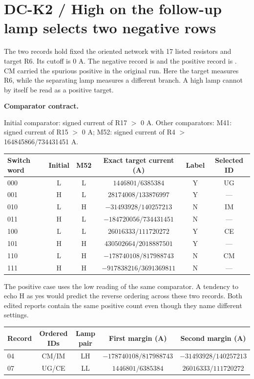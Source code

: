 \documentclass[12pt,letterpaper]{article}
\newcommand{\code}[1]{\texttt{\detokenize{#1}}}
\newcommand{\reading}[2]{\par\smallskip\textsf{\color{accent}\bfseries #1}\enspace #2\par}
\begin{document}
\clearpage\section{DC-K2 / High on the follow-up lamp selects two negative rows}

The two records hold fixed the oriented network with 17 listed resistors and target R6. Its cutoff is $0$ A. The negative record is \code{scope-04} and the positive record is \code{scope-07}. CM carried the spurious positive in the original run. Here the target measures R6, while the separating lamp measures a different branch. A high lamp cannot by itself be read as a positive target.

\reading{Comparator contract.}{} Initial comparator: signed current of R17 $>$ 0 A. Other comparators: M41: signed current of R15 $>$ 0 A; M52: signed current of R4 $>$ 164845866/734431451 A.

\begin{center}\small\begin{tabular}{@{}lccccc@{}}\toprule
Switch word & Initial & M52 & Exact target current (A) & Label & Selected ID\\\midrule
000 & L & L & $1446801/6385384$ & Y & UG\\
001 & H & L & $28174008/133876997$ & Y & ---\\
010 & L & H & $-31493928/140257213$ & N & IM\\
011 & H & L & $-184720056/734431451$ & N & ---\\
100 & L & L & $26016333/111720272$ & Y & CE\\
101 & H & H & $430502664/2018887501$ & Y & ---\\
110 & L & H & $-178740108/817988743$ & N & CM\\
111 & H & H & $-917838216/3691369811$ & N & ---\\\bottomrule\end{tabular}\end{center}

The positive case uses the low reading of the same comparator. A tendency to echo H as yes would predict the reverse ordering across these two records. Both edited reports contain the same positive count even though they name different settings.

\begin{center}\small\begin{tabular}{@{}lcccc@{}}\toprule
Record & Ordered IDs & Lamp pair & First margin (A) & Second margin (A)\\\midrule
04 & CM/IM & LH & $-178740108/817988743$ & $-31493928/140257213$\\
07 & UG/CE & LL & $1446801/6385384$ & $26016333/111720272$\\\bottomrule\end{tabular}\end{center}
\end{document}
